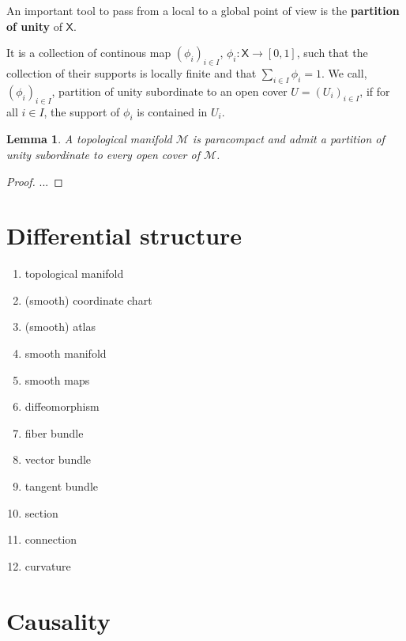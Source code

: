 \documentclass[11pt]{book}
\newcommand{\Mcal}{\mathcal{M}}
\newcommand{\Xsf}{\mathsf{X}}
\theoremstyle{break}
\newtheorem{lemma}{Lemma}
\newtheorem{proof}{Proof}
\begin{document}
\bigskip


An important tool to pass from a local to a global point of view is the \textbf{partition of unity} of $\Xsf$.

It is a collection of continous map $(\phi_i)_{i \in I}$, $\phi_i : \Xsf \to [0,1]$, such that the collection of their supports is locally finite and that $\sum_{i\in I} \phi_i = 1$. We call, $(\phi_i)_{i \in I}$, partition of unity subordinate to an open cover $U=(U_i)_{i \in I}$, if for all $i \in I$, the support of $\phi_i$ is contained in $U_i$.


\begin{lemma}
A topological manifold $\Mcal$ is paracompact and admit a partition of unity subordinate to every open cover of $\Mcal$.
\end{lemma}


\begin{proof}
...
\end{proof}


\section{Differential structure}


\begin{enumerate}
\setlength{\itemsep}{-4pt}
\item topological manifold
\item (smooth) coordinate chart
\item (smooth) atlas
\item smooth manifold
\item smooth maps
\item diffeomorphism
\item fiber bundle
\item vector bundle
\item tangent bundle
\item section
\item connection
\item curvature
\end{enumerate}


\section{Causality}
\end{document}

